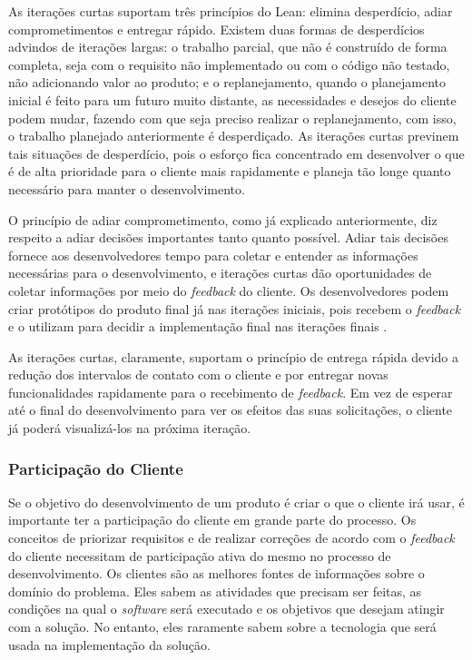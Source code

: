 As iterações curtas suportam três princípios do Lean: elimina desperdício, adiar comprometimentos e entregar rápido. Existem duas formas de desperdícios advindos de iterações largas: o trabalho parcial, que não é construído de forma completa, seja com o requisito não implementado ou com o código não testado, não adicionando valor ao produto; e o replanejamento, quando o planejamento inicial é feito para um futuro muito distante, as necessidades e desejos do cliente podem mudar, fazendo com que seja preciso realizar o replanejamento, com isso, o trabalho planejado anteriormente é desperdiçado. As iterações curtas previnem tais situações de desperdício, pois o esforço fica concentrado em desenvolver o que é de alta prioridade para o cliente mais rapidamente e planeja tão longe quanto necessário para manter o desenvolvimento.  

O princípio de adiar comprometimento, como já explicado anteriormente, diz respeito a adiar decisões importantes tanto quanto possível. Adiar tais decisões fornece aos desenvolvedores tempo para coletar e entender as informações necessárias para o desenvolvimento, e iterações curtas dão oportunidades de coletar informações por meio do \textit{feedback} do cliente. Os desenvolvedores podem criar protótipos do produto final já nas iterações iniciais, pois recebem o \textit{feedback} e o utilizam para decidir a implementação final nas iterações finais \cite{hibbs2009}.

As iterações curtas, claramente, suportam o princípio de entrega rápida devido a redução dos intervalos de contato com o cliente e por entregar novas funcionalidades rapidamente para o recebimento de \textit{feedback}. Em vez de esperar até o final do desenvolvimento para ver os efeitos das suas solicitações, o cliente já poderá visualizá-los na próxima iteração. 

\subsubsection[Participação do Cliente]{Participação do Cliente}

Se o objetivo do desenvolvimento de um produto é criar o que o cliente irá usar, é importante ter a participação do cliente em grande parte do processo. Os conceitos de priorizar requisitos e de realizar correções de acordo com o \textit{feedback} do cliente necessitam de participação ativa do mesmo no processo de desenvolvimento. 
Os clientes são as melhores fontes de informações sobre o domínio do problema. Eles sabem as atividades que precisam ser feitas, as condições na qual o \textit{software} será executado e os objetivos que desejam atingir com a solução. No entanto, eles raramente sabem sobre a tecnologia que será usada na implementação da solução.  

